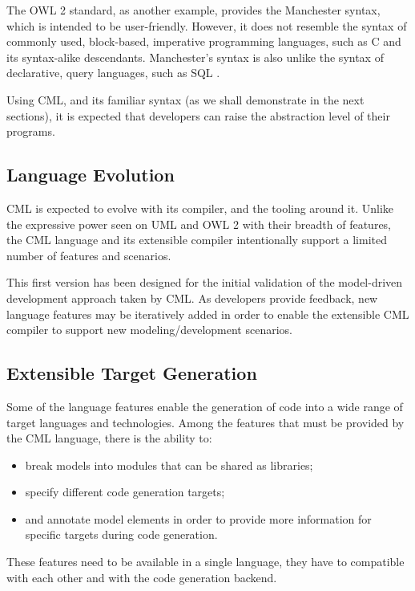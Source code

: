 The OWL 2 standard, as another example, provides the Manchester \cite{owl2manchester} syntax,
which is intended to be user-friendly.
However, it does not resemble the syntax of commonly used, block-based, imperative programming languages,
such as C \cite{clang} and its syntax-alike descendants.
Manchester's syntax is also unlike the syntax of declarative, query languages, such as SQL \cite{sql}.

Using CML,
and its familiar syntax (as we shall demonstrate in the next sections),
it is expected that developers can raise the abstraction level of their programs.

\subsection{Language Evolution}

CML is expected to evolve with its compiler, and the tooling around it.
Unlike the expressive power seen on UML \cite{uml} and OWL 2 \cite{owl2} with their breadth of features,
the CML language and its extensible compiler intentionally support a limited number of features and scenarios.

This first version has been designed for the initial validation of the model-driven development approach taken by CML.
As developers provide feedback,
new language features may be iteratively added in order to enable the extensible CML compiler to support new modeling/development scenarios.

\subsection{Extensible Target Generation}

Some of the language features enable the generation of code into a wide range of target languages and technologies. Among the features that must be provided by the CML language, there is the ability to:

\begin{itemize}
\item break models into modules that can be shared as libraries;
\item specify different code generation targets;
\item and annotate model elements in order to provide more information for specific targets during code generation.
\end{itemize}

These features need to be available in a single language, they have to compatible with each other and with the code generation backend.

